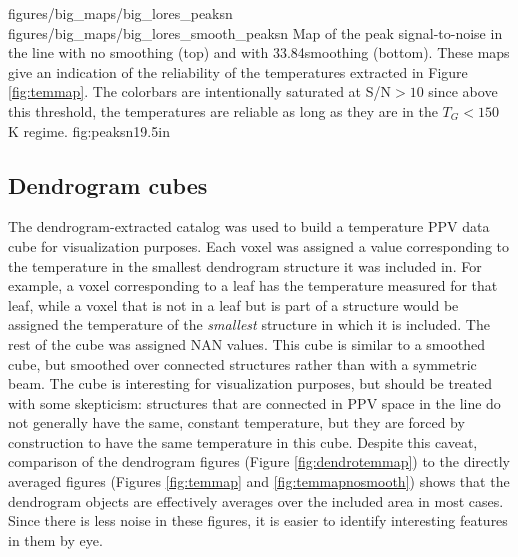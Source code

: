 \RotFigureTwoAA
{figures/big_maps/big_lores_peaksn}
{figures/big_maps/big_lores_smooth_peaksn}
{Map of the peak signal-to-noise in the \para \threeohthree line with no
smoothing (top) and with 33.84\arcsec smoothing (bottom).  
These maps give an indication of the reliability of the temperatures extracted
in Figure \ref{fig:temmap}.  The colorbars are intentionally saturated at
S/N$>10$ since above this threshold, the temperatures are reliable as long as
they are in the $T_G<150$ K regime.
}
{fig:peaksn}{1}{9.5in}

\clearpage
\subsection{Dendrogram cubes}

The dendrogram-extracted catalog was used to build a temperature PPV data cube
for visualization purposes.  Each voxel was assigned a value corresponding to
the temperature in the smallest dendrogram structure it was included in.  For
example, a voxel corresponding to a leaf has the temperature measured for that
leaf, while a voxel that is not in a leaf but is part of a structure would be
assigned the temperature of the \emph{smallest} structure in which it is
included.  The rest of the
cube was assigned NAN values.  This cube is similar to a smoothed cube, but
smoothed over connected structures rather than with a symmetric beam.  The cube
is interesting for visualization purposes, but should be treated with some
skepticism: structures that are connected in PPV space in the \threeohthree
line do not generally have the same, constant temperature, but they are forced
by construction to have the same temperature in this cube.  Despite this
caveat, comparison of the dendrogram figures (Figure \ref{fig:dendrotemmap}) to
the directly averaged figures (Figures \ref{fig:temmap} and
\ref{fig:temmapnosmooth}) shows that the dendrogram objects are effectively
averages over the included area in most cases.  Since there is less noise in
these figures, it is easier to identify interesting features in them by eye.

\clearpage



